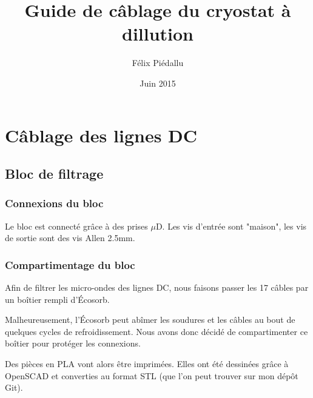\documentclass[a4paper,11pt]{article}
\title{Guide de câblage du cryostat à dillution}
\author{Félix Piédallu}
\date{Juin 2015}
\begin{document}
\maketitle
\tableofcontents

\begin{abstract}
\end{abstract}

\section{Câblage des lignes DC}
\subsection{Bloc de filtrage}
\subsubsection{Connexions du bloc}
Le bloc est connecté grâce à des prises $\mu$D. Les vis d'entrée sont "maison", les vis de sortie sont des vis Allen 2.5mm.

\subsubsection{Compartimentage du bloc}
Afin de filtrer les micro-ondes des lignes DC, nous faisons passer les 17 câbles par un boîtier rempli d'Écosorb.

Malheureusement, l'Écosorb peut abîmer les soudures et les câbles au bout de quelques cycles de refroidissement. Nous avons donc décidé de compartimenter ce boîtier pour protéger les connexions.

Des pièces en PLA vont alors être imprimées. Elles ont été dessinées grâce à OpenSCAD et converties au format STL (que l'on peut trouver sur mon dépôt Git).
\end{document}
